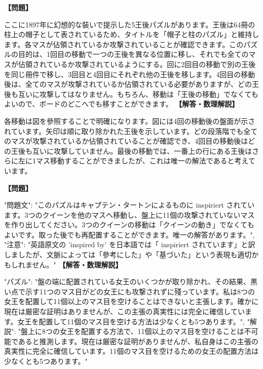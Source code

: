 \documentclass[10pt,a4paper,oneside,openany]{ltjsbook}
\begin{document}
\begin{tcolorbox}[colback=softblue,colframe=primaryblue,title=\textbf{第 315 問：帽子と柱のパズル （原題: THE HAT-PEG PUZZLE.）},arc=2mm,boxrule=1pt,breakable]
\textbf{【問題】}\par\vspace{0.3em}
ここに1897年に幻想的な裝いで提示した5王後パズルがあります。王後は64冊の柱上の帽子として表されているため、タイトルを「帽子と柱のパズル」と維持します。各マスが佔領されているか攻撃されていることが確認できます。このパズルの目的は、1回目の移動で一つの王後を異なる位置に移し、それでも全てのマスが佔領されているか攻撃されているようにする。回に2回目の移動で別の王後を同じ冊件で移し、3回目と4回目にそれぞれ他の王後を移します。4回目の移動後は、全てのマスが攻撃されているか佔領されている必要がありますが、どの王後も互いに攻撃してはなりません。もちろん、移動は「王後の移動」でなくてもよいので、ボードのどこへでも移すことができます。
\tcblower
\textbf{【解答・数理解説】}\par\vspace{0.3em}
各移動は図を參照することで明確になります。図には4回の移動後の盤面が示されています。矢印は順に取り除かれた王後を示しています。どの段落階でも全てのマスが攻撃されているか佔領されていることが確認でき、4回目の移動後はどの王後も互いに攻撃していません。最後の移動では、一番上の行にある王後はさらに左に1マス移動することができましたが、これは唯一の解法であると考えています。
\end{tcolorbox}

\begin{tcolorbox}[colback=softblue,colframe=primaryblue,title=\textbf{第 316 問：THE AMAZONS.},arc=2mm,boxrule=1pt,breakable]
\textbf{【問題】}\par\vspace{0.3em}
{
  "問題文": "このパズルはキャプテン・タートンによるものに inspiriert されています。3つのクイーンを他のマスへ移動し、盤上に11個の攻撃されていないマスを作り出してください。3つのクイーンの移動は「クイーンの動き」でなくてもよいです。取った後でも再配置することができます。唯一の解答があります。",
  "注意": "英語原文の 'inspired by' を日本語では「 inspiriert されています」と訳しましたが、文脈によっては「參考にした」や「基づいた」という表現も適切かもしれません。"
}
\tcblower
\textbf{【解答・数理解説】}\par\vspace{0.3em}
{
"パズル": "盤の端に配置されている女王のいくつかが取り除かれ、その結果、黒い点で示す11つのマス目がどの女王にも攻撃されずに殘っています。私は8つの女王を配置して11個以上のマス目を空けることはできないと主張します。確かに現在は厳密な証明はありませんが、この主張の真実性には完全に確信しています。女王を配置して11個のマス目を空ける方法は少なくとも5つあります。",
"解説": "盤上に8つの女王を配置する方法で、11個以上のマス目を空けることは不可能であると推測します。現在は厳密な証明がありませんが、私自身はこの主張の真実性に完全に確信しています。11個のマス目を空けるための女王の配置方法は少なくとも5つあります。"
}
\end{tcolorbox}
\end{document}
